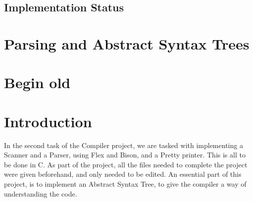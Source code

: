 \documentclass[a4paper,10pt,titlepage]{report}
\begin{document}
\subsection{Implementation Status}

\section{Parsing and Abstract Syntax Trees}
\section{Begin old}
\section{Introduction}
In the second task of the Compiler project, we are tasked with implementing a Scanner and a Parser, using Flex and Bison, and a Pretty printer. This is all to be done in C. As part of the project, all the files needed to complete the project were given beforehand, and only needed to be edited. An essential part of this project, is to implement an Abstract Syntax Tree, to give the compiler a way of understanding the code.
\end{document}
